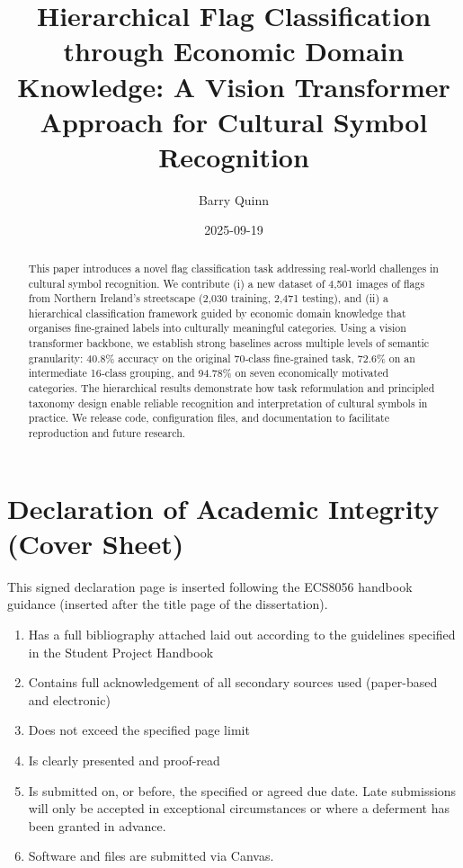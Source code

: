 \documentclass[
  a4paper,
]{article}
\title{Hierarchical Flag Classification through Economic Domain
Knowledge: A Vision Transformer Approach for Cultural Symbol
Recognition}
\author{Barry Quinn}
\date{2025-09-19}
\providecommand{\tightlist}{%
  \setlength{\itemsep}{0pt}\setlength{\parskip}{0pt}}\usepackage{longtable,booktabs,array}
\begin{document}
\maketitle
\begin{abstract}
This paper introduces a novel flag classification task addressing
real‑world challenges in cultural symbol recognition. We contribute (i)
a new dataset of 4,501 images of flags from Northern Ireland's
streetscape (2,030 training, 2,471 testing), and (ii) a hierarchical
classification framework guided by economic domain knowledge that
organises fine‑grained labels into culturally meaningful categories.
Using a vision transformer backbone, we establish strong baselines
across multiple levels of semantic granularity: 40.8\% accuracy on the
original 70‑class fine‑grained task, 72.6\% on an intermediate 16‑class
grouping, and 94.78\% on seven economically motivated categories. The
hierarchical results demonstrate how task reformulation and principled
taxonomy design enable reliable recognition and interpretation of
cultural symbols in practice. We release code, configuration files, and
documentation to facilitate reproduction and future research.
\end{abstract}


\section{Declaration of Academic Integrity (Cover
Sheet)}\label{declaration-of-academic-integrity-cover-sheet}

This signed declaration page is inserted following the ECS8056 handbook
guidance (inserted after the title page of the dissertation).

\begin{enumerate}
\def\labelenumi{\arabic{enumi}.}
\tightlist
\item
  Has a full bibliography attached laid out according to the guidelines
  specified in the Student Project Handbook
\item
  Contains full acknowledgement of all secondary sources used
  (paper-based and electronic)
\item
  Does not exceed the specified page limit
\item
  Is clearly presented and proof-read
\item
  Is submitted on, or before, the specified or agreed due date. Late
  submissions will only be accepted in exceptional circumstances or
  where a deferment has been granted in advance.
\item
  Software and files are submitted via Canvas.
\end{enumerate}
\end{document}
